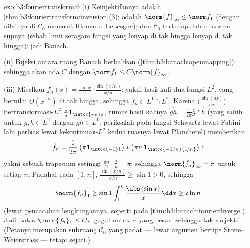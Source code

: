 \begin{solution}{exo:b3:fouriertransform:6}
(i) Keinjektifannya adalah
\cref{thm:b3:fouriertransform:inversion}(3);  adalah
$\norm{\hat f}_\infty \leq \norm f_1$ (dengan nilainya di
$\mathcal C_0$ menurut Riemann--Lebesgue); dan $\mathcal C_0$ tertutup
dalam norma supnya (sebab limit seragam fungsi yang lenyap di tak hingga
lenyap di tak hingga): jadi Banach.

(ii) Bijeksi  antara ruang Banach berbalikan
 (\cref{thm:b3:banach:openmapping}): sehingga
akan ada $C$ dengan $\norm f_1 \leq C\norm{\hat f}_\infty$.

(iii) Misalkan $f_n(x) = \frac{\sin x}x\cdot\frac{\sin(x/n)}{x/n}$:
yakni hasil kali dua fungsi $L^2$, yang bernilai $O(x^{-2})$ di
tak hingga, sehingga $f_n \in L^1\cap L^2$. Karena
$\bigl(\frac{\sin(ax)}{ax}\bigr)$ bertransformasi-$L^2$
$\frac\pi a\mathbf 1_{\intcc{-a}a}$, rumus hasil kalinya
$\widehat{gh} = \frac1{2\pi}\hat g * \hat h$ (yang sahih untuk $g, h
\in L^2$ dengan $gh \in L^1$; periksalah pada fungsi Schwartz lewat
Fubini lalu perluas lewat kekontinuan-$L^2$ kedua ruasnya lewat
Plancherel) memberikan
\[
\hat f_n = \frac1{2\pi}\,\bigl(\pi\mathbf
1_{\intcc{-1}1}\bigr) * \bigl(\pi n\,\mathbf
1_{\intcc{-1/n}{1/n}}\bigr):
\]
yakni sebuah trapesium setinggi $\frac{\pi n}2\cdot\frac2n = \pi$:
sehingga $\norm{\hat f_n}_\infty = \pi$ untuk setiap $n$. Padahal pada $[1,
n]$, $\frac{\sin(x/n)}{x/n} \geq \sin 1 > 0$, sehingga
\[
\norm{f_n}_1 \geq \sin 1\int_1^n\frac{\abs{\sin x}}x\dd x
\geq c\ln n
\]
(lewat pencacahan lengkungannya, seperti pada \cref{thm:b3:banach:fourierdiverge}).
Jadi batas $\norm{f_n}_1 \leq C\pi$ gagal untuk $n$ yang besar: sehingga tak
surjektif. (Petanya merupakan subruang $\mathcal C_0$ yang padat --- lewat
argumen bertipe Stone--Weierstrass --- tetapi sejati.)
\end{solution}

